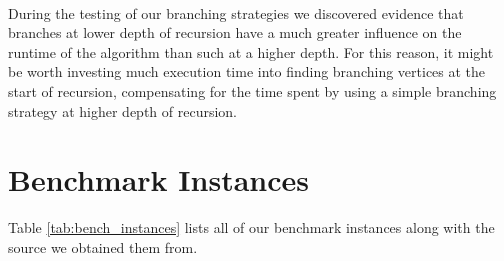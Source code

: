 \documentclass[12pt,a4paper,twoside]{scrartcl}
\numberwithin{equation}{section}
\begin{document}
\paragraph{}
During the testing of our branching strategies we discovered evidence that branches at lower depth of recursion have a much greater influence on the runtime of the algorithm than such at a higher depth. For this reason, it might be worth investing much execution time into finding branching vertices at the start of recursion, compensating for the time spent by using a simple branching strategy at higher depth of recursion.

\clearpage

\appendix{}
\section{Benchmark Instances}

Table \ref{tab:bench_instances} lists all of our benchmark instances along with the source we obtained them from.
\end{document}
